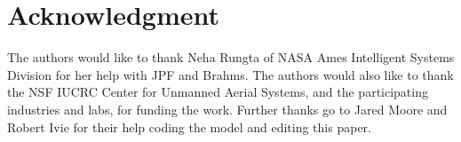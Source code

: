\documentclass[conference,letterpaper]{IEEEtran}
\begin{document}











\section*{Acknowledgment}
The authors would like to thank Neha Rungta of NASA Ames Intelligent
Systems Division for her help with JPF and Brahms. The authors would also like to thank the NSF IUCRC Center for Unmanned Aerial Systems, and the participating industries and labs, for funding the work. Further thanks go to Jared Moore and Robert Ivie for their help coding the model and editing this paper.






\end{document}
